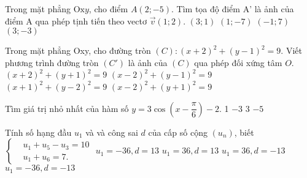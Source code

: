 \begin{ex}%
	Trong mặt phẳng $\text{Ox}y$, cho điểm $A\left({2;-5}\right)$. Tìm tọa độ điểm A’ là ảnh của điểm A qua phép tịnh tiến theo vectơ $\vec{v}\left({1;2}\right)$.
	\choice
	{$\left(3;1\right) $}
	{$\left(1;-7\right) $}
	{$\left(-1;7\right) $}
	{\True $\left(3;-3\right) $}
\end{ex}
\begin{ex}%
	Trong mặt phẳng Oxy, cho đường tròn $(C):(x+2)^2+(y-1)^2=9$. Viết phương trình đường tròn $\left(C'\right)$ là ảnh của $(C)$ qua phép đối xứng tâm $O$.
	\choice
	{$(x+2)^2+(y+1)^2=9$}
	{$(x-2)^2+(y-1)^2=9 $}
	{$(x+1)^2+(y-2)^2=9 $}
	{\True $(x-2)^2+(y+1)^2=9 $}
\end{ex}
\begin{ex}%
	Tìm giá trị nhỏ nhất của hàm số $y=3\cos\left(x-\dfrac{\pi}{6}\right)-2 $.
	\choice
	{1}
	{$-3$}
	{3}
	{\True $-5$}
\end{ex}
\begin{ex}%
	Tính số hạng đầu $u_1$ và và công sai $d$ của cấp số cộng $\left({u_n}\right)$, biết $\left\{\begin{aligned}& u_1+u_5-u_3=10 \\
	& u_1+u_6=7. 
	\end{aligned}\right.$
	\choice
	{$u_1=-36,d=13 $}
	{$u_1=36,d=13 $}
	{\True $u_1=36,d=-13 $}
	{$u_1=-36,d=-13 $}
\end{ex}
